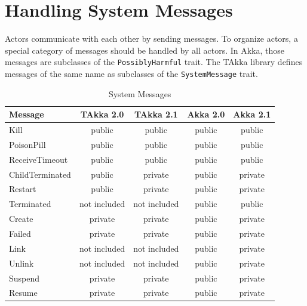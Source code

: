 \section{Handling System Messages}
\label{systemmessage}

Actors communicate with each other by sending messages.  To organize actors, a 
special category of messages should be handled by all actors.  In Akka, those 
messages are subclasses of the {\tt PossiblyHarmful} trait.  The TAkka library 
defines messages of the same name as subclasses of the {\tt SystemMessage} trait.


\begin{table}[h]
\begin{center}
\begin{tabular}{| l | c | c | c | c |}
  \hline
  Message & TAkka 2.0 & TAkka 2.1 & Akka 2.0 & Akka 2.1 \\
  \hline
  Kill  & public & public & public & public \\
  \hline
  PoisonPill & public & public & public & public \\
  \hline
  ReceiveTimeout & public & public & public & public \\
  \hline
  ChildTerminated & public & private & public & private \\
  \hline
  Restart & public & private & public & private \\
  \hline
  Terminated & not included & not included & public & public \\
  \hline
  Create  & private & private & public & private \\
  \hline
  Failed  & private & private & public & private \\
  \hline
  Link  & not included & not included & public & private \\
  \hline  
  Unlink  & not included & not included & public & private \\
  \hline 
  Suspend  & private & private & public & private \\
  \hline
  Resume  & private & private & public & private \\
  \hline
\end{tabular}
\end{center}
\caption{System Messages}
\label{system_messages}
\end{table}


